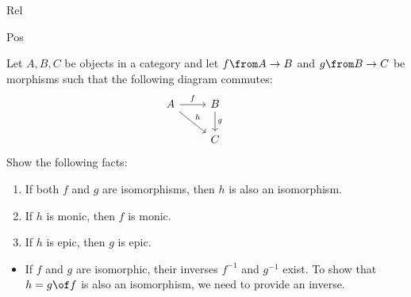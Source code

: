 \begin {definition}{Rel}
\begin{definition}{Pos}
\begin{exercise}
  Let $A, B, C$ be objects in a category and let $f \from A \to B$ and $g \from B \to C$ be morphisms such that the following diagram commutes:
  \[
    \begin{tikzcd}
      A \arrow{r}{f} \arrow{dr}{h} & B \arrow{d}{g} & \\
      & C &
    \end{tikzcd}
  \]
  Show the following facts:
  \begin{enumerate}
  \item If both $f$ and $g$ are isomorphisms, then $h$ is also an isomorphism.
  \item If $h$ is monic, then $f$ is monic.
  \item If $h$ is epic, then $g$ is epic.
  \end{enumerate}
\end{exercise}

\begin{answer}
    \begin{itemize}
  \item If $f$ and $g$ are isomorphic, their inverses
    $f^{-1}$ and $g^{-1}$ exist.
    To show that $h = g \of f$ is also an isomorphism,
    we need to provide an inverse.\\


\end{itemize}
\end{answer}
\end{definition}
\end{definition}
